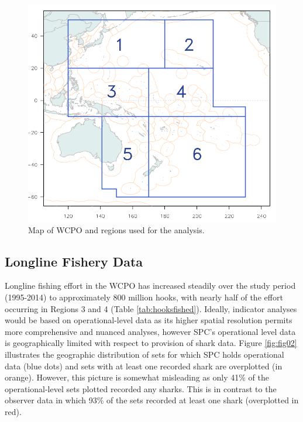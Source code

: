 \documentclass[12pt]{SCreport}
\begin{document}
\begin{figure}
\begin{center}
\includegraphics[width=\textwidth]{../GRAPHICS/Defined/FIG_01_MAP}
\caption{\label{fig:fig01} Map of WCPO and regions used for the analysis.}
\end{center}
\end{figure}


\subsection{Longline Fishery Data}
  
Longline fishing effort in the WCPO has increased steadily over the study period (1995-2014) to approximately 800 million hooks, with nearly half of the effort occurring in Regions 3 and 4 (Table \ref{tab:hooksfished}).  Ideally, indicator analyses would be based on operational-level data as its higher spatial resolution permits more comprehensive and nuanced analyses, however SPC's operational level data is geographically limited with respect to provision of shark data.  Figure \ref{fig:fig02} illustrates the geographic distribution of sets for which SPC holds operational data (blue dots) and sets with at least one recorded shark are overplotted (in orange). However, this picture is somewhat misleading as only 41\% of the operational-level sets plotted recorded any sharks. This is in contrast to the observer data in which 93\% of the sets recorded at least one shark (overplotted in red).
\end{document}
